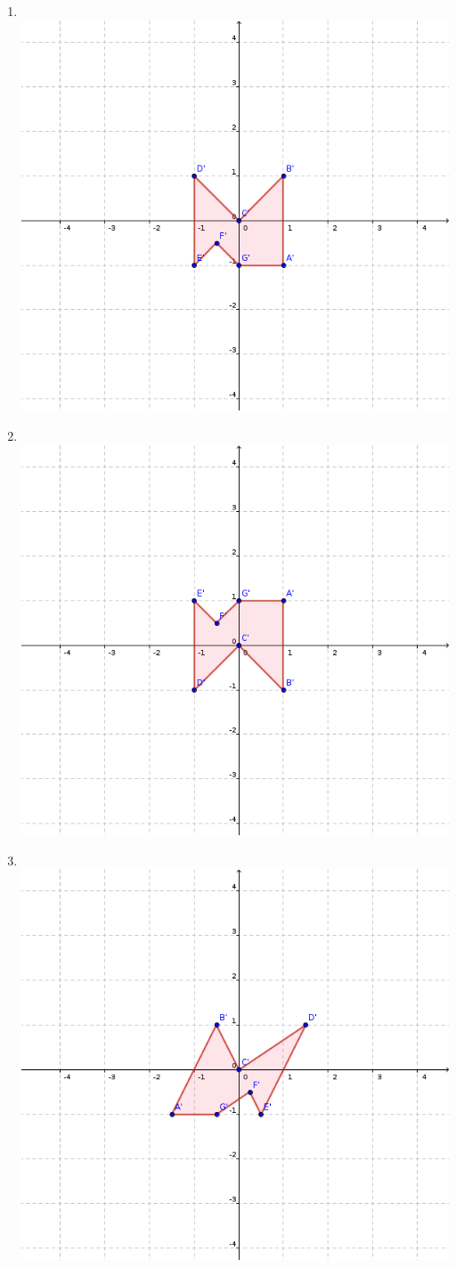 \documentclass[a4paper]{article}
\begin{document}
\begin{enumerate}
\begin{multicols}{2}
\begin{enumerate} [label=(\alph*)]
		\item ~\vspace{-5mm} \\ \includegraphics[width=0.7\linewidth]{images/1}
		\item ~\vspace{-5mm} \\ \includegraphics[width=0.7\linewidth]{images/2}
		\item ~\vspace{-5mm} \\ \includegraphics[width=0.7\linewidth]{images/3}

\end{enumerate}
\end{multicols}
\end{enumerate}
\end{document}
